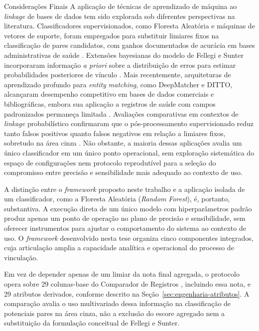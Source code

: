 \begin{chapter}{Considerações Finais}
A aplicação de técnicas de aprendizado de máquina ao \textit{linkage} de bases de dados tem sido explorada sob diferentes perspectivas na literatura. Classificadores supervisionados, como Floresta Aleatória e máquinas de vetores de suporte, foram empregados para substituir limiares fixos na classificação de pares candidatos, com ganhos documentados de acurácia em bases administrativas de saúde \cite{Christen2012book, Paixao2017linkageevaluation}. Extensões bayesianas do modelo de Fellegi e Sunter incorporaram informação \textit{a priori} sobre a distribuição de erros para estimar probabilidades posteriores de vínculo \cite{Fellegi1969theory, Enamorado2019fastlink}. Mais recentemente, arquiteturas de aprendizado profundo para \textit{entity matching}, como DeepMatcher e DITTO, alcançaram desempenho competitivo em bases de dados comerciais e bibliográficas, embora sua aplicação a registros de saúde com campos padronizados permaneça limitada \cite{Mudgal2018deepmatcher, Li2020ditto}. Avaliações comparativas em contextos de \textit{linkage} probabilístico confirmaram que o pós-processamento supervisionado reduz tanto falsos positivos quanto falsos negativos em relação a limiares fixos, sobretudo na área cinza \cite{Doidge2018demystifying, DuVall2010extending}. Não obstante, a maioria dessas aplicações avalia um único classificador em um único ponto operacional, sem exploração sistemática do espaço de configurações nem protocolo reprodutível para a seleção do compromisso entre precisão e sensibilidade mais adequado ao contexto de uso.

A distinção entre o \textit{framework} proposto neste trabalho e a aplicação isolada de um classificador, como a Floresta Aleatória (\textit{Random Forest}), é, portanto, substantiva. A execução direta de um único modelo com hiperparâmetros padrão produz apenas um ponto de operação no plano de precisão e sensibilidade, sem oferecer instrumentos para ajustar o comportamento do sistema ao contexto de uso. O \textit{framework} desenvolvido nesta tese organiza cinco componentes integrados, cuja articulação amplia a capacidade analítica e operacional do processo de vinculação.

Em vez de depender apenas de um limiar da nota final agregada, o protocolo opera sobre 29 colunas-base do Comparador de Registros \cite{Jardim2024comparador, Lucena2013algoritmos}, incluindo essa nota, e 29 atributos derivados, conforme descrito na Seção~\ref{sec:engenharia-atributos}. A comparação avalia o uso multivariado dessa informação na classificação de potenciais pares na área cinza, não a exclusão do escore agregado nem a substituição da formulação conceitual de Fellegi e Sunter.


\end{chapter}
